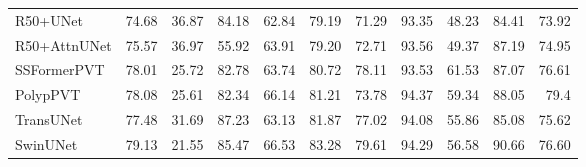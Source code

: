 \documentclass{midl}
\begin{document}
\begin{table*}[t]
{\begin{adjustbox}{width=1\textwidth}
{\begin{tabular}{lrrrrrrrrrr}
\\
R50+UNet \cite{chen2021transunet}                  & 74.68                    & 36.87                    & 84.18                                      & 62.84                                   & 79.19                                        & 71.29                                        & 93.35                                      & 48.23                                   & 84.41                                   & 73.92                                   
\\
R50+AttnUNet \cite{chen2021transunet}                   & 75.57                    & 36.97                    & 55.92                                      & 63.91                                   & 79.20                                        & 72.71                                        & 93.56                                      & 49.37                                   & 87.19                                   & 74.95                                   
\\
SSFormerPVT \cite{wang2022stepwise}                   & 78.01                    & 25.72                    & 82.78                                      & 63.74                                   & 80.72                                        & 78.11                                        & 93.53                                      & 61.53                                   & 87.07                                   & 76.61                                   \\ PolypPVT \cite{dong2021polyp}                       & 78.08                    & 25.61                    & 82.34                                      & 66.14                                   & 81.21                                        & 73.78                                        & 94.37                                      & 59.34                                   & 88.05                                   & 79.4                                    \\ TransUNet \cite{chen2021transunet}                    & 77.48                    & 31.69                     & 87.23                                      &  63.13                                   & 81.87                                       & 77.02                                        & 94.08                                     & 55.86                                   & 85.08                                   & 75.62                                      \\ SwinUNet \cite{cao2021swin}                      & 79.13                    & 21.55                    & 85.47                                      & 66.53                                  &  83.28                                        & 79.61                                        & 94.29                                      & 56.58                                   & 90.66                                   & 76.60                                  \\ 

\end{tabular}}
\end{adjustbox}}
\end{table*}
\end{document}
